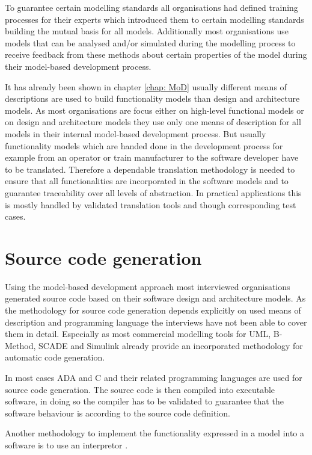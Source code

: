 \documentclass{./template/openetcs_report}
\begin{document}
To guarantee certain modelling standards all organisations had defined training processes for their experts which introduced them to certain modelling standards building the mutual basis for all models.  Additionally most organisations use models that can be analysed and/or simulated during the modelling process to receive feedback from these methods about certain properties of the model during their model-based development process.

It has already been shown in chapter \ref{chap: MoD} usually different means of descriptions are used to build functionality models than design and architecture models. As most organisations are focus either on high-level functional models or on design and architecture models they use only one means of description for all models in their internal model-based development process. But usually functionality models which are handed done in the development process for example from an operator or train manufacturer to the software developer have to be translated. Therefore a dependable translation methodology is needed to ensure that all functionalities are incorporated in the software models and to guarantee traceability over all levels of abstraction. In practical applications this is mostly handled by validated translation tools and though corresponding test cases.

\section{Source code generation}

Using the model-based development approach most interviewed organisations generated source code based on their software design and architecture models. As the  methodology for source code generation depends explicitly on used means of description and programming language the interviews have not been able to cover them in detail. Especially as most commercial modelling tools for UML, B-Method, SCADE and Simulink already provide an incorporated methodology for automatic code generation. 

In most cases ADA and C and their related programming languages are used for source code generation. The source code is then compiled into executable software, in doing so the compiler has to be validated to guarantee that the software behaviour is according to the source code definition.

Another methodology to implement the functionality expressed in a model into a software is to use an interpretor .
\end{document}
